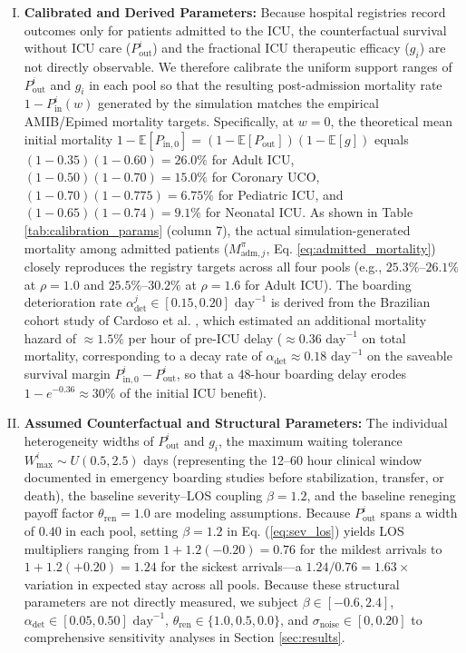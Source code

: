 \documentclass[final,5p,times,twocolumn]{elsarticle}
\begin{document}
\begin{enumerate}[(I)]
    \item \textbf{Calibrated and Derived Parameters:} Because hospital registries record outcomes only for patients admitted to the ICU, the counterfactual survival without ICU care ($P_{\text{out}}^i$) and the fractional ICU therapeutic efficacy ($g_i$) are not directly observable. We therefore calibrate the uniform support ranges of $P_{\text{out}}^i$ and $g_i$ in each pool so that the resulting post-admission mortality rate $1 - P_{\text{in}}^i(w)$ generated by the simulation matches the empirical AMIB/Epimed mortality targets. Specifically, at $w = 0$, the theoretical mean initial mortality $1 - \mathbb{E}[P_{\text{in},0}] = (1 - \mathbb{E}[P_{\text{out}}])(1 - \mathbb{E}[g])$ equals $(1 - 0.35)(1 - 0.60) = 26.0\%$ for Adult ICU, $(1 - 0.50)(1 - 0.70) = 15.0\%$ for Coronary UCO, $(1 - 0.70)(1 - 0.775) = 6.75\%$ for Pediatric ICU, and $(1 - 0.65)(1 - 0.74) = 9.1\%$ for Neonatal ICU. As shown in Table \ref{tab:calibration_params} (column 7), the actual simulation-generated mortality among admitted patients ($M_{\text{adm}, j}^{\pi}$, Eq. \ref{eq:admitted_mortality}) closely reproduces the registry targets across all four pools (e.g., $25.3\%$--$26.1\%$ at $\rho=1.0$ and $25.5\%$--$30.2\%$ at $\rho=1.6$ for Adult ICU). The boarding deterioration rate $\alpha_{\text{det}}^j \in [0.15, 0.20]\text{ day}^{-1}$ is derived from the Brazilian cohort study of Cardoso et al. \cite{cardoso2011impact}, which estimated an additional mortality hazard of $\approx 1.5\%$ per hour of pre-ICU delay ($\approx 0.36\text{ day}^{-1}$ on total mortality, corresponding to a decay rate of $\alpha_{\text{det}} \approx 0.18\text{ day}^{-1}$ on the saveable survival margin $P_{\text{in},0}^i - P_{\text{out}}^i$, so that a 48-hour boarding delay erodes $1 - e^{-0.36} \approx 30\%$ of the initial ICU benefit).
    \item \textbf{Assumed Counterfactual and Structural Parameters:} The individual heterogeneity widths of $P_{\text{out}}^i$ and $g_i$, the maximum waiting tolerance $W_{\max}^i \sim U(0.5, 2.5)$ days (representing the 12--60 hour clinical window documented in emergency boarding studies before stabilization, transfer, or death), the baseline severity--LOS coupling $\beta = 1.2$, and the baseline reneging payoff factor $\theta_{\text{ren}} = 1.0$ are modeling assumptions. Because $P_{\text{out}}^i$ spans a width of $0.40$ in each pool, setting $\beta = 1.2$ in Eq. (\ref{eq:sev_los}) yields LOS multipliers ranging from $1 + 1.2(-0.20) = 0.76$ for the mildest arrivals to $1 + 1.2(+0.20) = 1.24$ for the sickest arrivals---a $1.24 / 0.76 = 1.63\times$ variation in expected stay across all pools. Because these structural parameters are not directly measured, we subject $\beta \in [-0.6, 2.4]$, $\alpha_{\text{det}} \in [0.05, 0.50]\text{ day}^{-1}$, $\theta_{\text{ren}} \in \{1.0, 0.5, 0.0\}$, and $\sigma_{\text{noise}} \in [0, 0.20]$ to comprehensive sensitivity analyses in Section \ref{sec:results}.
\end{enumerate}
\end{document}
